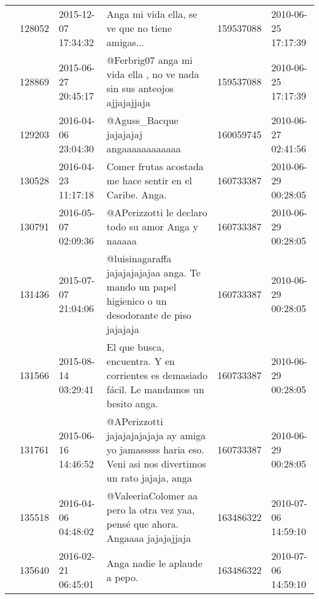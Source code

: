 \begin{tabular}{llllrl}
           & 128052  & 2015-12-07 17:34:32 &                                                                                              Anga mi vida ella, se ve que no tiene amigas... &   159537088 & 2010-06-25 17:17:39 \\
           & 128869  & 2015-06-27 20:45:17 &                                                                       @Ferbrig07 anga mi vida ella , no ve nada sin sus anteojos ajjajajjaja &   159537088 & 2010-06-25 17:17:39 \\
           & 129203  & 2016-04-06 23:04:30 &                                                                                                      @Aguss\_Bacque jajajajaj angaaaaaaaaaaaa &   160059745 & 2010-06-27 02:41:56 \\
           & 130528  & 2016-04-23 11:17:18 &                                                                                     Comer frutas acostada me hace sentir en el Caribe. Anga. &   160733387 & 2010-06-29 00:28:05 \\
           & 130791  & 2016-05-07 02:09:36 &                                                                                           @APerizzotti le declaro todo su amor Anga y naaaaa &   160733387 & 2010-06-29 00:28:05 \\
           & 131436  & 2015-07-07 21:04:06 &                                            @luisinagaraffa jajajajajajaa anga. Te mando un papel higienico o un desodorante de piso jajajaja &   160733387 & 2010-06-29 00:28:05 \\
           & 131566  & 2015-08-14 03:29:41 &                                                     El que busca, encuentra. Y en corrientes es demasiado fácil. Le mandamos un besito anga. &   160733387 & 2010-06-29 00:28:05 \\
           & 131761  & 2015-06-16 14:46:52 &                                    @APerizzotti jajajajajajaja ay amiga yo jamasssss haria eso. Veni asi nos divertimos un rato jajaja, anga &   160733387 & 2010-06-29 00:28:05 \\
           & 135518  & 2016-04-06 04:48:02 &                                                               @ValeeriaColomer aa pero la otra vez yaa, pensé que ahora. Angaaaa jajajajjaja &   163486322 & 2010-07-06 14:59:10 \\
           & 135640  & 2016-02-21 06:45:01 &                                                                                                                Anga nadie le aplaude a pepo. &   163486322 & 2010-07-06 14:59:10 \\

\end{tabular}
